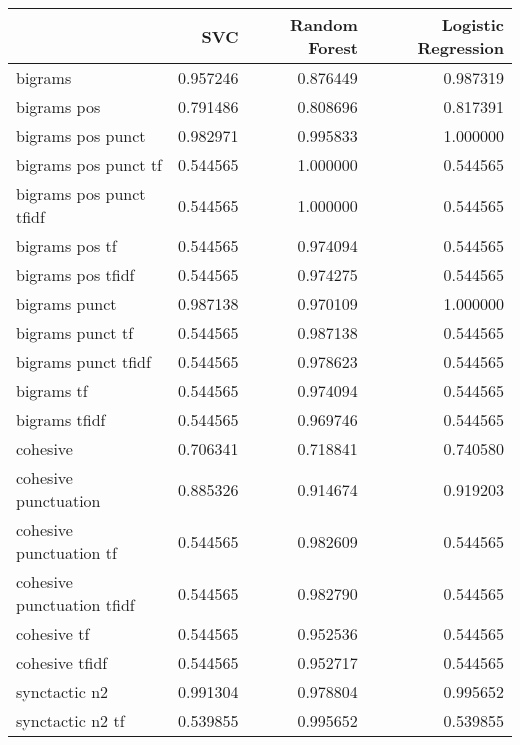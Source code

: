 \begin{tabular}{lrrr}
\toprule
{} &       SVC &  Random Forest &  Logistic Regression \\
\midrule
bigrams                    &  0.957246 &       0.876449 &             0.987319 \\
bigrams pos                &  0.791486 &       0.808696 &             0.817391 \\
bigrams pos punct          &  0.982971 &       0.995833 &             1.000000 \\
bigrams pos punct tf       &  0.544565 &       1.000000 &             0.544565 \\
bigrams pos punct tfidf    &  0.544565 &       1.000000 &             0.544565 \\
bigrams pos tf             &  0.544565 &       0.974094 &             0.544565 \\
bigrams pos tfidf          &  0.544565 &       0.974275 &             0.544565 \\
bigrams punct              &  0.987138 &       0.970109 &             1.000000 \\
bigrams punct tf           &  0.544565 &       0.987138 &             0.544565 \\
bigrams punct tfidf        &  0.544565 &       0.978623 &             0.544565 \\
bigrams tf                 &  0.544565 &       0.974094 &             0.544565 \\
bigrams tfidf              &  0.544565 &       0.969746 &             0.544565 \\
cohesive                   &  0.706341 &       0.718841 &             0.740580 \\
cohesive punctuation       &  0.885326 &       0.914674 &             0.919203 \\
cohesive punctuation tf    &  0.544565 &       0.982609 &             0.544565 \\
cohesive punctuation tfidf &  0.544565 &       0.982790 &             0.544565 \\
cohesive tf                &  0.544565 &       0.952536 &             0.544565 \\
cohesive tfidf             &  0.544565 &       0.952717 &             0.544565 \\
synctactic n2              &  0.991304 &       0.978804 &             0.995652 \\
synctactic n2 tf           &  0.539855 &       0.995652 &             0.539855 \\

\end{tabular}
